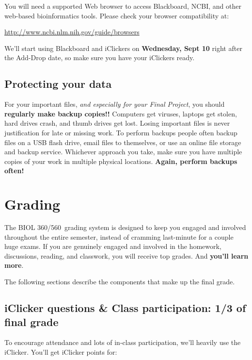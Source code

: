\documentclass[12pt]{article}
\newcommand{\course}{BIOL 360/560}
\begin{document}
You will need a supported Web browser to access Blackboard, NCBI, and other
web-based bioinformatics tools. Please check your browser compatibility at:

 \url{http://www.ncbi.nlm.nih.gov/guide/browsers}

We'll start using Blackboard and iClickers on \textbf{Wednesday, Sept 10} right after the
Add-Drop date, so make sure you have your iClickers ready.


\subsection{Protecting your data}
\label{sec:protecting-your-data}

For your important files, \textit{and especially for your Final Project}, you
should  \textbf{regularly make backup copies!!}  Computers get viruses, laptops get
stolen, hard drives crash, and thumb drives get lost.  Losing important files is
never justification for late or missing work.  To perform backups people often backup files on a USB
flash drive, email files to themselves, or use an online file storage and backup
service.  Whichever approach you take, make sure you have multiple copies of
your work in multiple physical locations. \textbf{Again, perform backups often!}



\section{Grading}
\label{sec:grading}
The \course\ grading system is designed to keep you engaged and involved
throughout the entire semester, instead of cramming last-minute for a couple huge
exams.  If you are genuinely engaged and involved in the homework, discussions,
reading, and classwork, you will receive top grades.  And  \textbf{you'll learn
  more}.


The following sections describe the components that make up the final grade.

\subsection{iClicker questions \& Class participation: 1/3  of final grade}
\label{sec:iclicker-25}

To encourage attendance and lots of in-class participation, we'll heavily use
the iClicker.   You'll get iClicker points for:
\end{document}
